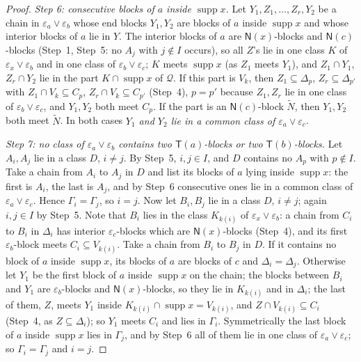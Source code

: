 \documentclass[11pt]{amsart}
\theoremstyle{definition}
\newcommand{\supp}{\operatorname{supp}}
\newcommand{\T}{\mathsf{T}}
\newcommand{\N}{\mathsf{N}}
\begin{document}
\begin{proof}
\emph{Step 6: consecutive blocks of $a$ inside $\supp x$.} Let $Y_1,Z_1,\dots,Z_r,Y_2$ be a chain in $\varepsilon_a\vee\varepsilon_b$ whose end blocks $Y_1,Y_2$ are blocks of $a$ inside $\supp x$ and whose interior blocks of $a$ lie in $Y$. The interior blocks of $a$ are $\N(x)$-blocks and $\N(c)$-blocks (Step~1, Step~5: no $A_j$ with $j\notin I$ occurs), so all $Z$'s lie in one class $K$ of $\varepsilon_x\vee\varepsilon_b$ and in one class of $\varepsilon_b\vee\varepsilon_c$; $K$ meets $\supp x$ (as $Z_1$ meets $Y_1$), and $Z_1\cap Y_1$, $Z_r\cap Y_2$ lie in the part $K\cap\supp x$ of $\mathcal Q$. If this part is $V_k$, then $Z_1\subseteq\Delta_p$, $Z_r\subseteq\Delta_{p'}$ with $Z_1\cap V_k\subseteq C_p$, $Z_r\cap V_k\subseteq C_{p'}$ (Step~4), $p=p'$ because $Z_1,Z_r$ lie in one class of $\varepsilon_b\vee\varepsilon_c$, and $Y_1,Y_2$ both meet $C_p$. If the part is an $\N(c)$-block $\tilde N$, then $Y_1,Y_2$ both meet $\tilde N$. In both cases \emph{$Y_1$ and $Y_2$ lie in a common class of $\varepsilon_a\vee\varepsilon_c$}.

\emph{Step 7: no class of $\varepsilon_a\vee\varepsilon_b$ contains two $\T(a)$-blocks or two $\T(b)$-blocks.} Let $A_i,A_j$ lie in a class $D$, $i\ne j$. By Step~5, $i,j\in I$, and $D$ contains no $A_p$ with $p\notin I$. Take a chain from $A_i$ to $A_j$ in $D$ and list its blocks of $a$ lying inside $\supp x$: the first is $A_i$, the last is $A_j$, and by Step~6 consecutive ones lie in a common class of $\varepsilon_a\vee\varepsilon_c$. Hence $\Gamma_i=\Gamma_j$, so $i=j$. Now let $B_i,B_j$ lie in a class $D$, $i\ne j$; again $i,j\in I$ by Step~5. Note that $B_i$ lies in the class $K_{k(i)}$ of $\varepsilon_x\vee\varepsilon_b$: a chain from $C_i$ to $B_i$ in $\Delta_i$ has interior $\varepsilon_c$-blocks which are $\N(x)$-blocks (Step~4), and its first $\varepsilon_b$-block meets $C_i\subseteq V_{k(i)}$. Take a chain from $B_i$ to $B_j$ in $D$. If it contains no block of $a$ inside $\supp x$, its blocks of $a$ are blocks of $c$ and $\Delta_i=\Delta_j$. Otherwise let $Y_1$ be the first block of $a$ inside $\supp x$ on the chain; the blocks between $B_i$ and $Y_1$ are $\varepsilon_b$-blocks and $\N(x)$-blocks, so they lie in $K_{k(i)}$ and in $\Delta_i$; the last of them, $Z$, meets $Y_1$ inside $K_{k(i)}\cap\supp x=V_{k(i)}$, and $Z\cap V_{k(i)}\subseteq C_i$ (Step~4, as $Z\subseteq\Delta_i$); so $Y_1$ meets $C_i$ and lies in $\Gamma_i$. Symmetrically the last block of $a$ inside $\supp x$ lies in $\Gamma_j$, and by Step~6 all of them lie in one class of $\varepsilon_a\vee\varepsilon_c$; so $\Gamma_i=\Gamma_j$ and $i=j$.


\end{proof}
\end{document}
